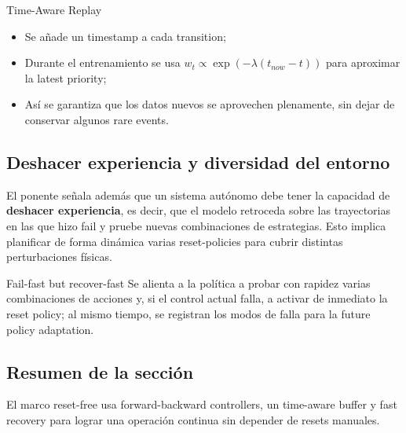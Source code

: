 \begin{knowledgebox}{Time-Aware Replay}
\begin{itemize}
\item Se añade un timestamp a cada transition;\\
\item Durante el entrenamiento se usa $w_t \propto \exp(-\lambda (t_{now}-t))$ para aproximar la latest priority;\\
\item Así se garantiza que los datos nuevos se aprovechen plenamente, sin dejar de conservar algunos rare events.
\end{itemize}
\end{knowledgebox}

\subsection{Deshacer experiencia y diversidad del entorno}
El ponente señala además que un sistema autónomo debe tener la capacidad de \textbf{deshacer experiencia}, es decir, que el modelo retroceda sobre las trayectorias en las que hizo fail y pruebe nuevas combinaciones de estrategias. Esto implica planificar de forma dinámica varias reset-policies para cubrir distintas perturbaciones físicas.
\begin{warningbox}{Fail-fast but recover-fast}
Se alienta a la política a probar con rapidez varias combinaciones de acciones y, si el control actual falla, a activar de inmediato la reset policy; al mismo tiempo, se registran los modos de falla para la future policy adaptation.
\end{warningbox}

\subsection{Resumen de la sección}
El marco reset-free usa forward-backward controllers, un time-aware buffer y fast recovery para lograr una operación continua sin depender de resets manuales.
\newpage
